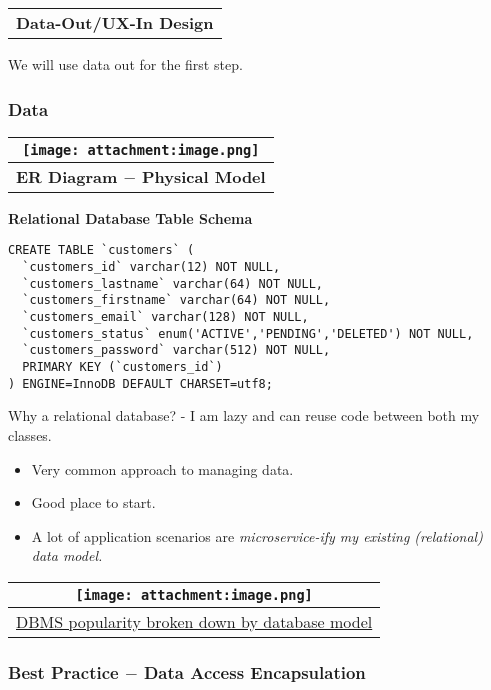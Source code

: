 \documentclass[11pt]{article}
\makeatletter
\def\maxwidth{\ifdim\Gin@nat@width>\linewidth\linewidth
    \else\Gin@nat@width\fi}
\let\Oldincludegraphics\includegraphics
\renewcommand{\includegraphics}[1]{\Oldincludegraphics[width=.8\maxwidth]{#1}}
\makeatother
\begin{document}
\begin{longtable}[]{@{}c@{}}
\toprule
\tabularnewline
\midrule
\endhead
\textbf{Data-Out/UX-In Design}\tabularnewline
\bottomrule
\end{longtable}

We will use data out for the first step.

    \subsubsection{Data}\label{data}

\begin{longtable}[]{@{}c@{}}
\toprule
\texttt{[image: attachment:image.png]}\tabularnewline
\midrule
\endhead
\textbf{ER Diagram \(-\) Physical Model}\tabularnewline
\bottomrule
\end{longtable}

     \textbf{Relational Database Table Schema}

\begin{verbatim}
CREATE TABLE `customers` (
  `customers_id` varchar(12) NOT NULL,
  `customers_lastname` varchar(64) NOT NULL,
  `customers_firstname` varchar(64) NOT NULL,
  `customers_email` varchar(128) NOT NULL,
  `customers_status` enum('ACTIVE','PENDING','DELETED') NOT NULL,
  `customers_password` varchar(512) NOT NULL,
  PRIMARY KEY (`customers_id`)
) ENGINE=InnoDB DEFAULT CHARSET=utf8;
\end{verbatim}

    Why a relational database? - I am lazy and can reuse code between both
my classes.

\begin{itemize}
\item
  Very common approach to managing data.
\item
  Good place to start.
\item
  A lot of application scenarios are \emph{microservice-ify my existing
  (relational) data model.}
\end{itemize}

\begin{longtable}[]{@{}c@{}}
\toprule
\texttt{[image: attachment:image.png]}\tabularnewline
\midrule
\endhead
\href{https://db-engines.com/en/ranking_categories}{DBMS popularity
broken down by database model}\tabularnewline
\bottomrule
\end{longtable}

    \subsubsection{\texorpdfstring{Best Practice \(-\) Data Access
Encapsulation}{Best Practice - Data Access Encapsulation}}\label{best-practice---data-access-encapsulation}
\end{document}
